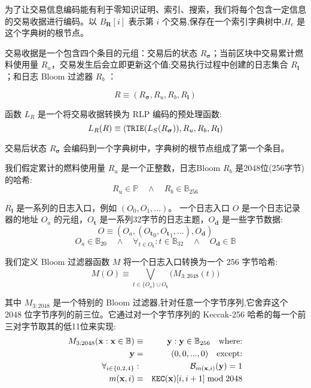 \documentclass[9pt,oneside]{amsart}
\begin{document}
\begin{multicols}{2}
为了让交易信息编码能有利于零知识证明、索引、搜索，我们将每个包含一定信息的交易收据进行编码。以 $B_\mathbf{R}[i]$ 表示第 $i$ 个交易,保存在一个索引字典树中,$H_e$ 是这个字典树的根节点。

交易收据是一个包含四个条目的元组：交易后的状态 $R_{\boldsymbol{\sigma}}$；当前区块中交易累计燃料使用量 $R_u$，交易发生后会立即更新这个值;交易执行过程中创建的日志集合 $R_\mathbf{l}$；和日志 Bloom 过滤器 $R_b$ ：

\begin{equation}
R \equiv (R_{\boldsymbol{\sigma}}, R_u, R_b, R_\mathbf{l})
\end{equation}

函数 $L_R$ 是一个将交易收据转换为 RLP 编码的预处理函数:
\begin{equation}
L_R(R) \equiv (\mathtt{\small TRIE}(L_S(R_{\boldsymbol{\sigma}})), R_u, R_b, R_\mathbf{l})
\end{equation}

交易后状态 $R_{\boldsymbol{\sigma}}$ 会编码到一个字典树中，字典树的根节点组成了第一个条目。

我们假定累计的燃料使用量 $R_u$ 是一个正整数，日志Bloom $R_b$ 是2048位(256字节)的哈希:
\begin{equation}
R_u \in \mathbb{P} \quad \wedge \quad R_b \in \mathbb{B}_{256}
\end{equation}


$R_\mathbf{l}$ 是一系列的日志入口，例如 $(O_0, O_1, ...)$。 一个日志入口 $O$ 是一个日志记录器的地址 $O_a$ 的元组，$O_\mathbf{t}$ 是一系列32字节的日志主题，$O_\mathbf{d}$ 是一些字节数据:
\begin{equation}
O \equiv (O_a, ({O_\mathbf{t}}_0, {O_\mathbf{t}}_1, ...), O_\mathbf{d})
\end{equation}
\begin{equation}
O_a \in \mathbb{B}_{20} \quad \wedge \quad \forall_{t \in O_\mathbf{t}}: t \in \mathbb{B}_{32} \quad \wedge \quad O_\mathbf{d} \in \mathbb{B}
\end{equation}

我们定义 Bloom 过滤器函数 $M$ 将一个日志入口转换为一个 256 字节哈希:
\begin{equation}
M(O) \equiv \bigvee_{t \in \{O_a\} \cup O_\mathbf{t}} \big( M_{3:2048}(t) \big)
\end{equation}


其中 $M_{3:2048}$ 是一个特别的 Bloom 过滤器,针对任意一个字节序列,它舍弃这个 2048 位字节序列的前三位。它通过对一个字节序列的 Keccak-256 哈希的每一个前三对字节取其的低11位来实现:
\begin{eqnarray}
M_{3:2048}(\mathbf{x}: \mathbf{x} \in \mathbb{B}) & \equiv & \mathbf{y}: \mathbf{y} \in \mathbb{B}_{256} \quad \text{where:}\\
\mathbf{y} & = & (0, 0, ..., 0) \quad \text{except:}\\
\forall_{i \in \{0, 2, 4\}}&:& \mathcal{B}_{m(\mathbf{x}, i)}(\mathbf{y}) = 1\\
m(\mathbf{x}, i) &\equiv& \mathtt{\tiny KEC}(\mathbf{x})[i, i + 1] \bmod 2048
\end{eqnarray}


\end{multicols}
\end{document}

